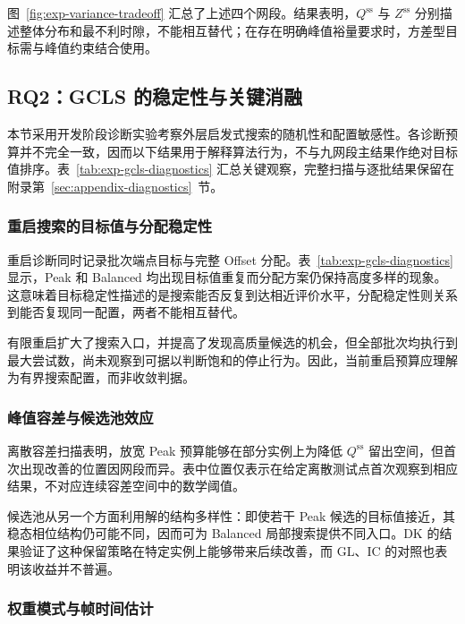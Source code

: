 \documentclass[UTF8,a4paper,twoside,zihao=-4]{ctexart}
\numberwithin{equation}{section}
\numberwithin{figure}{section}
\numberwithin{table}{section}
\theoremstyle{definition}
\numberwithin{algocf}{section}
\begin{document}
图~\ref{fig:exp-variance-tradeoff} 汇总了上述四个网段。结果表明，$Q^{\mathrm{ss}}$ 与 $Z^{\mathrm{ss}}$ 分别描述整体分布和最不利时隙，不能相互替代；在存在明确峰值裕量要求时，方差型目标需与峰值约束结合使用。

\subsection{RQ2：GCLS 的稳定性与关键消融}
\label{subsec:exp-rq2}

本节采用开发阶段诊断实验考察外层启发式搜索的随机性和配置敏感性。各诊断预算并不完全一致，因而以下结果用于解释算法行为，不与九网段主结果作绝对目标值排序。表~\ref{tab:exp-gcls-diagnostics} 汇总关键观察，完整扫描与逐批结果保留在附录第~\ref{sec:appendix-diagnostics}~节。



\subsubsection{重启搜索的目标值与分配稳定性}
\label{subsubsec:exp-rq2-restart}

重启诊断同时记录批次端点目标与完整 Offset 分配。表~\ref{tab:exp-gcls-diagnostics} 显示，Peak 和 Balanced 均出现目标值重复而分配方案仍保持高度多样的现象。这意味着目标稳定性描述的是搜索能否反复到达相近评价水平，分配稳定性则关系到能否复现同一配置，两者不能相互替代。

有限重启扩大了搜索入口，并提高了发现高质量候选的机会，但全部批次均执行到最大尝试数，尚未观察到可据以判断饱和的停止行为。因此，当前重启预算应理解为有界搜索配置，而非收敛判据。

\subsubsection{峰值容差与候选池效应}
\label{subsubsec:exp-rq2-tolerance-pool}

离散容差扫描表明，放宽 Peak 预算能够在部分实例上为降低 $Q^{\mathrm{ss}}$ 留出空间，但首次出现改善的位置因网段而异。表中位置仅表示在给定离散测试点首次观察到相应结果，不对应连续容差空间中的数学阈值。

候选池从另一个方面利用解的结构多样性：即使若干 Peak 候选的目标值接近，其稳态相位结构仍可能不同，因而可为 Balanced 局部搜索提供不同入口。DK 的结果验证了这种保留策略在特定实例上能够带来后续改善，而 GL、IC 的对照也表明该收益并不普遍。

\subsubsection{权重模式与帧时间估计}
\label{subsubsec:exp-rq2-weight}
\end{document}
